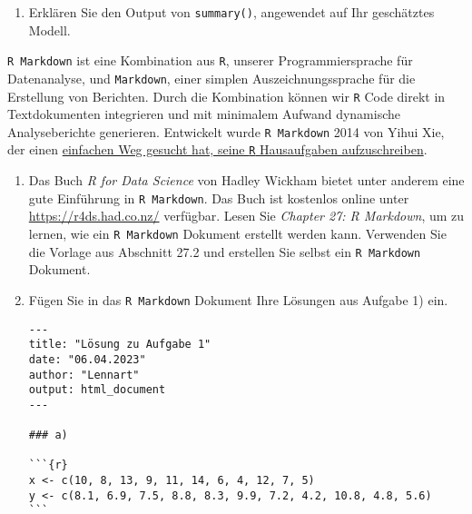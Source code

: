 \begin{enumerate}

\item Erklären Sie den Output von \texttt{summary()}, angewendet auf Ihr geschätztes Modell.


\end{enumerate}


\texttt{R Markdown} ist eine Kombination aus \texttt{R}, unserer Programmiersprache für Datenanalyse, und \texttt{Markdown}, einer simplen Auszeichnungssprache für die Erstellung von Berichten. Durch die Kombination können wir \texttt{R} Code direkt in Textdokumenten integrieren und mit minimalem Aufwand dynamische Analyseberichte generieren. Entwickelt wurde \texttt{R Markdown} 2014 von Yihui Xie, der einen \href{https://www.youtube.com/watch?v=LussVnrLZKU}{einfachen Weg gesucht hat, seine \texttt{R} Hausaufgaben aufzuschreiben}.

\begin{enumerate}

\item Das Buch \emph{R for Data Science} von Hadley Wickham bietet unter anderem eine gute Einführung in \texttt{R Markdown}. Das Buch ist kostenlos online unter \href{https://r4ds.had.co.nz/}{https://r4ds.had.co.nz/} verfügbar. Lesen Sie \emph{Chapter 27: R Markdown}, um zu lernen, wie ein \texttt{R Markdown} Dokument erstellt werden kann. Verwenden Sie die Vorlage aus Abschnitt 27.2 und erstellen Sie selbst ein \texttt{R Markdown} Dokument.

    
\item Fügen Sie in das \texttt{R Markdown} Dokument Ihre Lösungen aus Aufgabe 1) ein.

\ifcomment
\begin{framed}
\begin{minipage}[fragile]{0.9\textwidth}
\begin{verbatim}
---
title: "Lösung zu Aufgabe 1"
date: "06.04.2023"
author: "Lennart"
output: html_document
---

### a)

```{r}
x <- c(10, 8, 13, 9, 11, 14, 6, 4, 12, 7, 5)
y <- c(8.1, 6.9, 7.5, 8.8, 8.3, 9.9, 7.2, 4.2, 10.8, 4.8, 5.6)
```
\end{verbatim}
\end{minipage}
\end{framed}
\fi

\end{enumerate}



